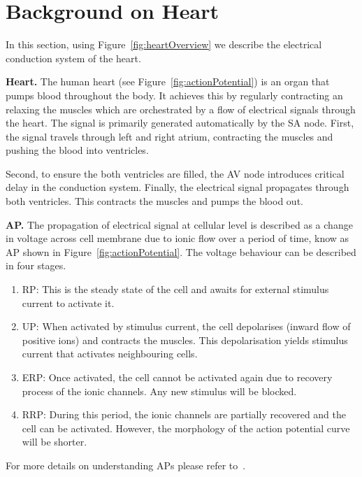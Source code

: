 \section{Background on Heart }
\begin{figure*}[htbp]
	\centering
	
	\caption{Electrical conduction systems of a heart}
	\label{fig:heartOverview}
\end{figure*}

In this section, using Figure~\ref{fig:heartOverview} we 
describe the electrical conduction system of the heart.

\noindent \textbf{Heart.}
The human heart (see Figure~\ref{fig:actionPotential})
 is an organ that pumps blood throughout the body.
It achieves this by regularly contracting an relaxing the muscles
which are orchestrated by a flow of electrical signals through the heart.
The signal is primarily generated automatically by the \ac{SA} node.
First, the signal travels through left and right atrium, contracting 
the muscles and pushing the blood into ventricles.
 
Second, to ensure the both ventricles are filled, 
the \ac{AV} node introduces critical delay 
in the conduction system.   
Finally, the electrical signal propagates through 
both ventricles. This contracts the muscles and pumps the blood out.


	
\noindent \textbf{\acf{AP}.} 
The propagation of electrical signal at cellular level 
is described as a change in  voltage 
across cell membrane due to ionic flow over a period of time, 
know as \acf{AP} shown in Figure~\ref{fig:actionPotential}. 
The voltage behaviour can be described in four stages.
\begin{enumerate}
	\item \acf{RP}: This is the steady state of the cell and awaits for 
					external stimulus current to activate it.
	\item \acf{UP}: When activated by stimulus current, 
					the cell depolarises (inward flow of positive ions) and 
					contracts the muscles. This depolarisation yields 
					stimulus current that activates neighbouring cells.
	\item \acf{ERP}: Once activated, the cell cannot be activated again 
					 due to recovery process of the ionic channels. 
					 Any new stimulus will be blocked. 
	\item \acf{RRP}: During this period, the ionic channels are partially recovered
					 and the cell can be activated. However, the morphology
					 of the action potential curve will be shorter.
	
\end{enumerate} 
 For more details on understanding \acp{AP} please refer to~\cite{chen14}.\\

